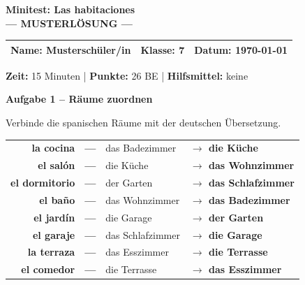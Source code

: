 \documentclass[11pt, a4paper]{article}
\newcommand{\fachfarbe}{spanisch}
\newcommand{\thema}{Minitest: Las habitaciones}
\newcommand{\klasse}{7}
\newcommand{\maxpunkte}{26}
\newcommand{\zeit}{15 Minuten}
\newcommand{\datum}{\today}
\newcommand{\punktebox}[1]{\hfill\fbox{\small \_/#1}}
\newcommand{\lsg}[1]{\textcolor{loesung}{\textbf{#1}}}
\newenvironment{aufgabe}[1]{%
    \needspace{5\baselineskip}%
    \nopagebreak[4]%
    \vspace{10pt}
    \noindent\textbf{\textcolor{\fachfarbe}{Aufgabe #1}}
    \nopagebreak[4]%
    \vspace{5pt}
    \nopagebreak[4]%
    \begin{list}{}{\leftmargin=0pt}
    \item[]
}{%
    \end{list}
}
\newcommand{\es}[1]{\textcolor{\fachfarbe}{\textbf{#1}}}
\begin{document}

\begin{center}
    {\Large\bfseries\textcolor{\fachfarbe}{\thema}}\\[0.3em]
    {\large\textcolor{loesung}{\textbf{--- MUSTERLÖSUNG ---}}}
\end{center}

\vspace{5pt}

\noindent
\begin{tabularx}{\textwidth}{|X|X|X|}
\hline
\textbf{Name:} \lsg{Musterschüler/in} &
\textbf{Klasse:} \klasse &
\textbf{Datum:} \datum \\
\hline
\end{tabularx}

\vspace{10pt}

\begin{infobox}
\textbf{Zeit:} \zeit{} | \textbf{Punkte:} \maxpunkte{} BE | \textbf{Hilfsmittel:} keine
\end{infobox}

\vspace{15pt}


\begin{aufgabe}{1 -- Räume zuordnen}
Verbinde die spanischen Räume mit der deutschen Übersetzung. \punktebox{8}
\end{aufgabe}

\begin{center}
\begin{tabular}{rclp{4cm}}
\es{la cocina} & \lsg{---} & das Badezimmer & \lsg{$\rightarrow$ die Küche} \\[0.8em]
\es{el salón} & \lsg{---} & die Küche & \lsg{$\rightarrow$ das Wohnzimmer} \\[0.8em]
\es{el dormitorio} & \lsg{---} & der Garten & \lsg{$\rightarrow$ das Schlafzimmer} \\[0.8em]
\es{el baño} & \lsg{---} & das Wohnzimmer & \lsg{$\rightarrow$ das Badezimmer} \\[0.8em]
\es{el jardín} & \lsg{---} & die Garage & \lsg{$\rightarrow$ der Garten} \\[0.8em]
\es{el garaje} & \lsg{---} & das Schlafzimmer & \lsg{$\rightarrow$ die Garage} \\[0.8em]
\es{la terraza} & \lsg{---} & das Esszimmer & \lsg{$\rightarrow$ die Terrasse} \\[0.8em]
\es{el comedor} & \lsg{---} & die Terrasse & \lsg{$\rightarrow$ das Esszimmer} \\
\end{tabular}
\end{center}
\end{document}
